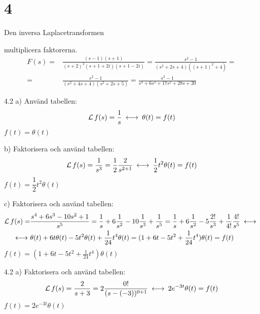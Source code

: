 \chapter{4}{Den inversa Laplacetransformen}

\begin{task}{4.1}
	multiplicera faktorerna.
	\begin{align*}
	F(s)=
	&\frac{(s-1)(s+1)}{(s+2)^2(s+1+2i)(s+1-2i)}=
	\frac{s^2-1}{(s^2+2s+4)((s+1)^2+4)}= \\ =
	&\frac{s^2-1}{(s^2+4s+4)(s^2+2s+5)}=
	\frac{s^2-1}{s^4+6s^3+17s^2+28s+20}
	\end{align*}
\end{task}

\begin{task}{4.2 a)}
	Använd tabellen:
	\[\laplace f(s)=\frac{1}{s}\llra \theta(t)=f(t)\]
	\ans $f(t)=\theta(t)$
\end{task}

\begin{task}{b)}
	Faktorisera och använd tabellen:
	\[\laplace f(s)=\frac{1}{s^3}=\frac{1}{2}\*\frac{2}{s^{2+1}}\llra \frac{1}{2}t^2\theta(t)=f(t)\]
	\ans $f(t)=\dfrac{1}{2}t^2\theta(t)$
\end{task}

\begin{task}{c)}
	Faktorisera och använd tabellen:
	\begin{align*}
	\laplace f(s)=
	&\frac{s^4+6s^3-10s^2+1}{s^5}=
	\frac{1}{s}+6\frac{1}{s^2}-10\frac{1}{s^3}+\frac{1}{s^5}=
	\frac{1}{s}+6\frac{1}{s^2}-5\frac{2!}{s^3}+\frac{1}{4!}\*\frac{4!}{s^5}\llra \\ \llra
	&\theta(t)+6t\theta(t)-5t^2\theta(t)+\frac{1}{24}t^4\theta(t)=
	(1+6t-5t^2+\frac{1}{24}t^4)\theta(t)=
	f(t)
	\end{align*}
	\ans $f(t)=(1+6t-5t^2+\frac{1}{24}t^4)\theta(t)$
\end{task}

\begin{task}{4.2 a)}
	Faktorisera och använd tabellen:
	\[\laplace f(s)=\frac{2}{s+3}=2\frac{0!}{(s-(-3))^{0+1}}\llra 2e^{-3t}\theta(t)=f(t)\]
	\ans $f(t)=2e^{-3t}\theta(t)$
\end{task}